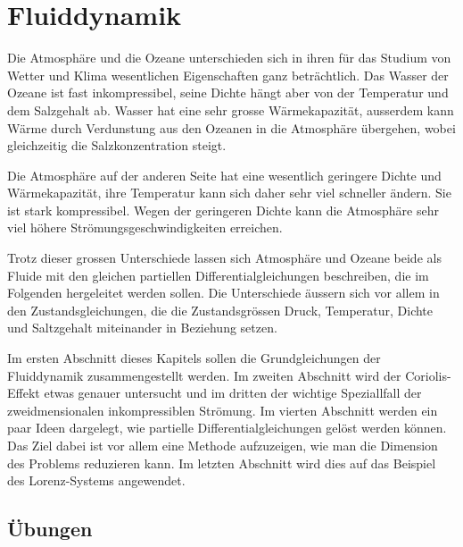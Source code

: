 %
%
%
\chapter{Fluiddynamik\label{chapter:fluiddynamik}}
\rhead{}
Die Atmosphäre und die Ozeane unterschieden sich in ihren
für das Studium von Wetter und Klima wesentlichen Eigenschaften
ganz beträchtlich.
Das Wasser der Ozeane ist fast inkompressibel, seine Dichte hängt aber
von der Temperatur und dem Salzgehalt ab.
Wasser hat eine sehr grosse Wärmekapazität, ausserdem kann Wärme durch
Verdunstung aus den Ozeanen in die Atmosphäre übergehen, wobei gleichzeitig
die Salzkonzentration steigt.

Die Atmosphäre auf der anderen Seite hat eine wesentlich geringere
Dichte und Wärmekapazität, ihre Temperatur kann sich daher sehr viel
schneller ändern.
Sie ist stark kompressibel.
Wegen der geringeren Dichte kann die Atmosphäre sehr viel höhere
Strömungsgeschwindigkeiten erreichen.

Trotz dieser grossen Unterschiede lassen sich Atmosphäre und Ozeane
beide als Fluide mit den gleichen partiellen Differentialgleichungen
beschreiben, die im Folgenden hergeleitet werden sollen.
Die Unterschiede äussern sich vor allem in den Zustandsgleichungen,
die die Zustandsgrössen Druck, Temperatur, Dichte und Saltzgehalt
miteinander in Beziehung setzen.

Im ersten Abschnitt dieses Kapitels sollen die Grundgleichungen
der Fluiddynamik zusammengestellt werden.
Im zweiten Abschnitt wird der Coriolis-Effekt etwas genauer 
untersucht und im dritten der wichtige Speziallfall der 
zweidmensionalen inkompressiblen Strömung.
Im vierten Abschnitt werden ein paar Ideen dargelegt, wie partielle
Differentialgleichungen gelöst werden können.
Das Ziel dabei ist vor allem eine Methode aufzuzeigen, wie man die
Dimension des Problems reduzieren kann.
Im letzten Abschnitt wird dies auf das Beispiel des Lorenz-Systems angewendet.








\section*{Übungen}
\begin{uebungsaufgaben}
\item

\item

\item

\end{uebungsaufgaben}


